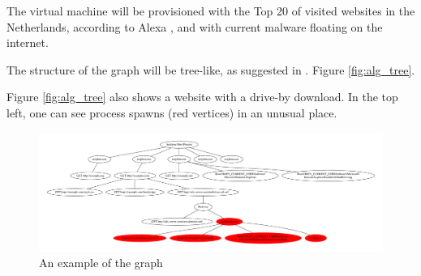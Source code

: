 The virtual machine will be provisioned with the Top 20 of visited websites in the Netherlands, according to Alexa \cite{http://www.alexa.com/topsites/countries/NL}, and with current malware floating on the internet.

The structure of the graph will be tree-like, as suggested in . Figure \ref{fig:alg_tree}.

Figure \ref{fig:alg_tree} also shows a website with a drive-by download. In the top left, one can see process spawns (red vertices) in an unusual place.

\begin{figure}[h]
    \centering
    \centerline{\includegraphics[width=19cm]{Images/alg_tree}}
    \caption{An example of the graph}
    \label{fig:graph}
\end{figure}

